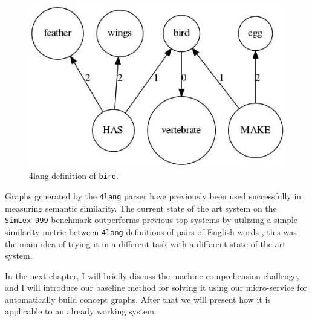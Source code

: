 \begin{figure}[!htb]
	\centering
	\includegraphics[scale=0.5]{figures/bird}
	\caption{4lang definition of \texttt{bird}.}
	\label{fig:bird}
\end{figure}

Graphs generated by the \texttt{4lang} parser have previously been used
successfully in measuring semantic similarity. The current state of the
art system on the \texttt{SimLex-999} benchmark \cite{Hill:2014a}
outperforms previous top systems by utilizing a simple similarity metric
between \texttt{4lang} definitions of pairs of English words
\cite{Recski:2016c}, this was the main idea of trying it in a different task with a different state-of-the-art system.

In the next chapter, I will briefly discuss the machine comprehension challenge, and I will introduce our baseline method for solving it using our micro-service for automatically build concept graphs. After that we will present how it is applicable to an already working system.